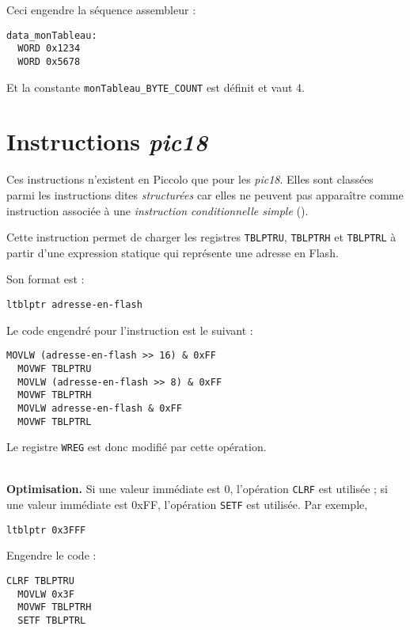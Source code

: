Ceci engendre la séquence assembleur :

\begin{lstlisting}[language=assembleur]
data_monTableau:
  WORD 0x1234
  WORD 0x5678
\end{lstlisting}

Et la constante \texttt{monTableau\_BYTE\_COUNT} est définit et vaut 4.



\section{Instructions \emph{pic18}}

Ces instructions n'existent en Piccolo que pour les \emph{pic18}. Elles sont classées parmi les instructions dites \emph{structurées} car elles ne peuvent pas apparaître comme instruction associée à une \emph{instruction conditionnelle simple} ().




Cette instruction permet de charger les registres \texttt{TBLPTRU}, \texttt{TBLPTRH} et \texttt{TBLPTRL} à partir d'une expression statique qui représente une adresse en Flash.

Son format est :
\begin{lstlisting}[language=piccolo]
  ltblptr adresse-en-flash
\end{lstlisting}

Le code engendré pour l'instruction est le suivant :
\begin{lstlisting}[language=assembleur]
  MOVLW (adresse-en-flash >> 16) & 0xFF
  MOVWF TBLPTRU
  MOVLW (adresse-en-flash >> 8) & 0xFF
  MOVWF TBLPTRH
  MOVLW adresse-en-flash & 0xFF
  MOVWF TBLPTRL
\end{lstlisting}

Le registre \texttt{WREG} est donc modifié par cette opération.

~\\
\textbf{Optimisation.} Si une valeur immédiate est 0, l'opération \texttt{CLRF} est utilisée ; si une valeur immédiate est 0xFF, l'opération \texttt{SETF} est utilisée. Par exemple, 
\begin{lstlisting}[language=piccolo]
  ltblptr 0x3FFF
\end{lstlisting}

Engendre le code :
\begin{lstlisting}[language=assembleur]
  CLRF TBLPTRU
  MOVLW 0x3F
  MOVWF TBLPTRH
  SETF TBLPTRL
\end{lstlisting}


